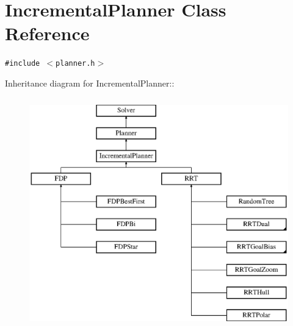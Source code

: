 \section{Incremental\-Planner  Class Reference}
\label{classIncrementalPlanner}
{\tt \#include $<$planner.h$>$}

Inheritance diagram for Incremental\-Planner::\begin{figure}[H]
\begin{center}
\leavevmode
\includegraphics[height=10cm]{classIncrementalPlanner}
\end{center}
\end{figure}

